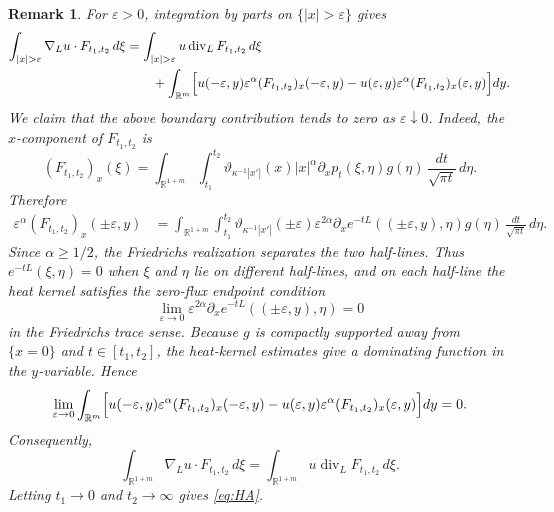 \documentclass[12pt]{amsart}
\newtheorem{remark}[theorem]{Remark}
\begin{document}
\begin{remark}
For $\varepsilon>0$, integration by parts on $\{|x|>\varepsilon\}$ gives
\begin{align*}
\int_{|x|>\varepsilon} \nabla_L u \cdot F_{t_1,t_2} \, d\xi &= \int_{|x|>\varepsilon} u \operatorname{div}_L F_{t_1,t_2} \, d\xi\\
&\qquad + \int_{\mathbb R^m} \Bigl[ u(-\varepsilon,y)\varepsilon^\alpha (F_{t_1,t_2})_x(-\varepsilon,y) - u(\varepsilon,y)\varepsilon^\alpha (F_{t_1,t_2})_x(\varepsilon,y) \Bigr] dy.
\end{align*}
We claim that the above boundary contribution tends to zero as
$\varepsilon\downarrow0$. Indeed, the $x$-component of $F_{t_1,t_2}$ is
\begin{equation*}
(F_{t_1,t_2})_x(\xi) = \int_{\mathbb R^{1+m}} \int_{t_1}^{t_2} \vartheta_{\kappa^{-1} |x'|}(x) |x|^\alpha\partial_xp_t(\xi,\eta) g(\eta) \, \frac{dt}{\sqrt{\pi t}} \, d\eta.
\end{equation*}
Therefore
\begin{align*}
\varepsilon^\alpha (F_{t_1,t_2})_x(\pm\varepsilon,y) &= \int_{\mathbb R^{1+m}} \int_{t_1}^{t_2} \vartheta_{\kappa^{-1} |x'|}(\pm\varepsilon) \varepsilon^{2\alpha} \partial_x e^{-tL}((\pm\varepsilon,y),\eta) g(\eta) \, \frac{dt}{\sqrt{\pi t}} \, d\eta.
\end{align*}
Since $\alpha\ge 1/2$, the Friedrichs realization separates the two half-lines.
Thus $e^{-tL}(\xi,\eta)=0$ when $\xi$ and $\eta$ lie on different half-lines, and on each half-line the heat kernel satisfies the zero-flux endpoint condition
\begin{equation*}
    \lim_{\varepsilon \to 0}
    \varepsilon^{2\alpha}\partial_x e^{-tL}((\pm\varepsilon,y),\eta)=0
\end{equation*}
in the Friedrichs trace sense. Because $g$ is compactly supported away from
$\{x=0\}$ and $t\in[t_1,t_2]$, the heat-kernel estimates give a dominating
function in the $y$-variable. Hence
\begin{align*}
\lim_{\varepsilon\to 0} \int_{\mathbb R^m} \Bigl[ u(-\varepsilon,y)\varepsilon^\alpha (F_{t_1,t_2})_x(-\varepsilon,y) - u(\varepsilon,y)\varepsilon^\alpha (F_{t_1,t_2})_x(\varepsilon,y) \Bigr] dy = 0.
\end{align*}
Consequently,
\begin{equation*}
\int_{\mathbb R^{1+m}} \nabla_Lu \cdot F_{t_1,t_2} \, d\xi = \int_{\mathbb R^{1+m}} u \operatorname{div}_L F_{t_1,t_2} \, d\xi.
\end{equation*}
Letting $t_1 \to 0$ and $t_2 \to \infty$ gives \eqref{eq:HA}.
\end{remark}
\end{document}
